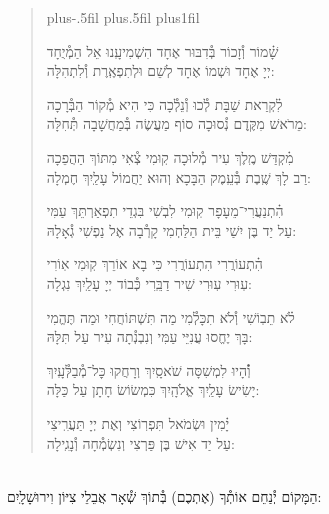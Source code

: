 \documentclass[twoside, openany, parskip=half, 11pt]{book}
\begin{document}
\begin{quote}
\leftskip=0pt plus-.5fil
\rightskip=0pt plus.5fil
\parfillskip=0pt plus1fil


\lechadodi

שָׁ֗מוֹר וְ֯זָכוֹר בְּ֯דִבּוּר אֶחָד \hfill
הִשְׁמִיעָֽנוּ אֵל הַמְ֯יֻחָד \\
יְיָ אֶחָד וּשְׁמוֹ אֶחָד \hfill
לְשֵׁם וּלְתִפְאֶֽרֶת וְ֯לִתְהִלָּה:

\lechadodi

לִ֗קְרַאת שַׁבָּת לְ֯כוּ וְ֯נֵלְ֯כָה \hfill
כִּי הִיא מְ֯קוֹר הַבְּ֯רָכָה \\
מֵרֹאשׁ מִקֶּֽדֶם נְ֯סוּכָה \hfill
סוֹף מַעֲשֶׂה בְּ֯מַחֲשָׁבָה תְּ֯חִלָּה:

\lechadodi

מִ֗קְדַּשׁ מֶֽלֶךְ עִיר מְ֯לוּכָה \hfill
קֽוּמִי צְ֯אִי מִתּוֹךְ הַהֲפֵכָה \\
רַב לָךְ שֶֽׁבֶת בְּ֯עֵֽמֶק הַבָּכָא \hfill
וְהוּא יַחֲמוֹל עָלַֽיִךְ חֶמְלָה:

\lechadodi

הִ֗תְנַעֲרִי־מֵעָפָר קֽוּמִי \hfill
לִבְשִׁי בִּגְדֵי תִפְאַרְתֵּךְ עַמִּי \\
עַל יַד בֶּן יִשַׁי בֵּית הַלַּחְמִי \hfill
קָרְ֯בָה אֶל נַפְשִׁי גְ֯אָלָהּ:

\lechadodi

הִ֗תְעוֹרֲרִי הִתְעוֹרֲרִי \hfill
כִּי בָא אוֹרֵךְ קֽוּמִי אֽוֹרִי \\
עֽוּרִי עֽוּרִי שִׁיר דַבֵּֽרִי \hfill
כְּ֯בוֹד יְיָ עָלַֽיִךְ נִגְלָה:

\lechadodi

לֹ֗א תֵבֽוֹשִׁי וְ֯לֹא תִכָּלְ֯מִי \hfill
מַה תִּשְׁתּוֹחֲחִי וּמַה תֶּהֱמִי \\
בָּךְ יֶחֱסוּ עֲנִיֵּי עַמִּי \hfill
וְנִבְנְ֯תָה עִיר עַל תִּלָּהּ:

\lechadodi

וְ֯֗הָיוּ לִמְשִׁסָּה שֹׁאסָֽיִךְ \hfill
וְרָחֲקוּ כׇּל־מְ֯בַלְּ֯עָֽיִךְ \\
יָשִׂישׂ עָלַֽיִךְ אֱלֹהָֽיִךְ \hfill
כִּמְשׂוֹשׂ חָתָן עַל כַּלָּה:

\lechadodi

יָ֗מִין וּשְׂמֹאל תִּפְרֽוֹצִי \hfill
וְאֶת יְיָ תַּעֲרִֽיצִי \\
עַל יַד אִישׁ בֶּן פַּרְצִי \hfill
וְנִשְׂמְ֯חָה וְ֯נָגִֽילָה:

\lechadodi

\end{quote}

\begin{sometimes}

\\
הַמָּקוֹם יְ֯נַחֵם אוֹתְ֯ךָ (אֶתְכֶם) בְּ֯תוֹךְ שְׁ֯אָר אֲבֵלֵי צִיּוֹן וִירוּשָׁלָֽיִם:

\end{sometimes}
\end{document}
